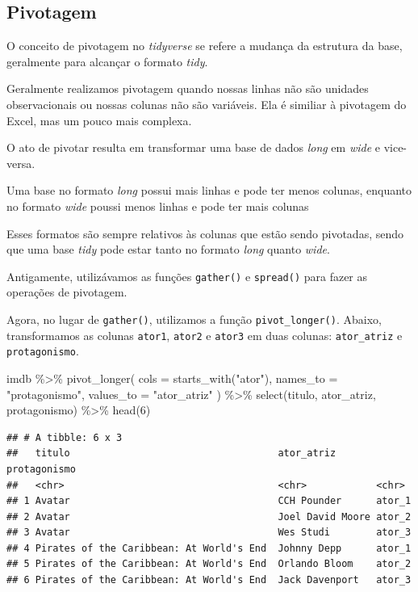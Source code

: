 \documentclass[
]{book}
\newenvironment{Shaded}{\begin{snugshade}}{\end{snugshade}}
\newcommand{\AttributeTok}[1]{\textcolor[rgb]{0.77,0.63,0.00}{#1}}
\newcommand{\DecValTok}[1]{\textcolor[rgb]{0.00,0.00,0.81}{#1}}
\newcommand{\FunctionTok}[1]{\textcolor[rgb]{0.00,0.00,0.00}{#1}}
\newcommand{\NormalTok}[1]{#1}
\newcommand{\SpecialCharTok}[1]{\textcolor[rgb]{0.00,0.00,0.00}{#1}}
\newcommand{\StringTok}[1]{\textcolor[rgb]{0.31,0.60,0.02}{#1}}
\begin{document}
\hypertarget{pivotagem}{%
\subsection{Pivotagem}\label{pivotagem}}

O conceito de pivotagem no \emph{tidyverse} se refere a mudança da estrutura da base, geralmente para alcançar o formato \emph{tidy}.

Geralmente realizamos pivotagem quando nossas linhas não são unidades observacionais ou nossas colunas não são variáveis. Ela é similiar à pivotagem do Excel, mas um pouco mais complexa.

O ato de pivotar resulta em transformar uma base de dados \emph{long} em \emph{wide} e vice-versa.

Uma base no formato \emph{long} possui mais linhas e pode ter menos colunas, enquanto no formato \emph{wide} poussi menos linhas e pode ter mais colunas

Esses formatos são sempre relativos às colunas que estão sendo pivotadas, sendo que uma base \emph{tidy} pode estar tanto no formato \emph{long} quanto \emph{wide}.

Antigamente, utilizávamos as funções \texttt{gather()} e \texttt{spread()} para fazer as operações de pivotagem.

Agora, no lugar de \texttt{gather()}, utilizamos a função \texttt{pivot\_longer()}. Abaixo, transformamos as colunas \texttt{ator1}, \texttt{ator2} e \texttt{ator3} em duas colunas: \texttt{ator\_atriz} e \texttt{protagonismo}.

\begin{Shaded}
\begin{Highlighting}[]
\NormalTok{imdb }\SpecialCharTok{\%\textgreater{}\%} 
  \FunctionTok{pivot\_longer}\NormalTok{(}
    \AttributeTok{cols =} \FunctionTok{starts\_with}\NormalTok{(}\StringTok{"ator"}\NormalTok{), }
    \AttributeTok{names\_to =} \StringTok{"protagonismo"}\NormalTok{,}
    \AttributeTok{values\_to =} \StringTok{"ator\_atriz"}
\NormalTok{  ) }\SpecialCharTok{\%\textgreater{}\%} 
  \FunctionTok{select}\NormalTok{(titulo, ator\_atriz, protagonismo) }\SpecialCharTok{\%\textgreater{}\%} 
  \FunctionTok{head}\NormalTok{(}\DecValTok{6}\NormalTok{)}
\end{Highlighting}
\end{Shaded}

\begin{verbatim}
## # A tibble: 6 x 3
##   titulo                                    ator_atriz       protagonismo
##   <chr>                                     <chr>            <chr>       
## 1 Avatar                                    CCH Pounder      ator_1      
## 2 Avatar                                    Joel David Moore ator_2      
## 3 Avatar                                    Wes Studi        ator_3      
## 4 Pirates of the Caribbean: At World's End  Johnny Depp      ator_1      
## 5 Pirates of the Caribbean: At World's End  Orlando Bloom    ator_2      
## 6 Pirates of the Caribbean: At World's End  Jack Davenport   ator_3
\end{verbatim}
\end{document}
